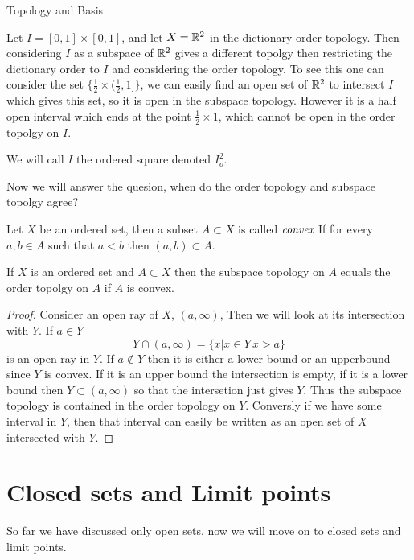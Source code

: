 \begin{chapter}{Topology and Basis}
   \begin{ex}
    Let $I = [0, 1] \times [0, 1]$, and let $X = \mathbb{R}^2$ in the dictionary order topology. Then considering $I$ as a subspace of $\mathbb{R}^2$ gives a different topolgy then restricting the dictionary order to $I$ and considering the order topology. 
    To see this one can consider the set $\{\frac{1}{2} \times (\frac{1}{2}, 1]\}$, we can easily find an open set of $\mathbb{R}^2$ to intersect $I$ which gives this set, so it is open in the subspace topology. However it is a half open interval which ends 
    at the point $\frac{1}{2} \times 1$, which cannot be open in the order topolgy on $I$.

    We will call $I$ the ordered square denoted $I^2_o$. 

   \end{ex}

   Now we will answer the quesion, when do the order topology and subspace topolgy agree? 
   \begin{defn}
    Let $X$ be an ordered set, then a subset $A \subset X$ is called $\emph{convex}$ If for every $a, b \in A$ such that $a < b$ then $(a, b) \subset A$. 
   \end{defn}

   \begin{thm}
    If $X$ is an ordered set and $A \subset X$ then the subspace topology on $A$ equals the order topolgy on $A$ if $A$ is convex. 
   \end{thm}

   \begin{proof}
    Consider an open ray of $X$, $(a, \infty)$, Then we will look at its intersection with $Y$. If $a \in Y$ 
    \[Y \cap (a, \infty) = \{x | x \in Y \, x > a\}\]
    is an open ray in $Y$. If $a \notin Y$ then it is either a lower bound or an upperbound since $Y$ is convex. 
    If it is an upper bound the intersection is empty, if it is a lower bound then $Y \subset (a, \infty)$ so that the 
    intersetion just gives $Y$. Thus the subspace topology is contained in the order topology on $Y$. Conversly if we have 
    some interval in $Y$, then that interval can easily be written as an open set of $X$ intersected with $Y$.
   \end{proof}


   \section{Closed sets and Limit points}
   So far we have discussed only open sets, now we will move on to closed sets and limit points. 


\end{chapter}
